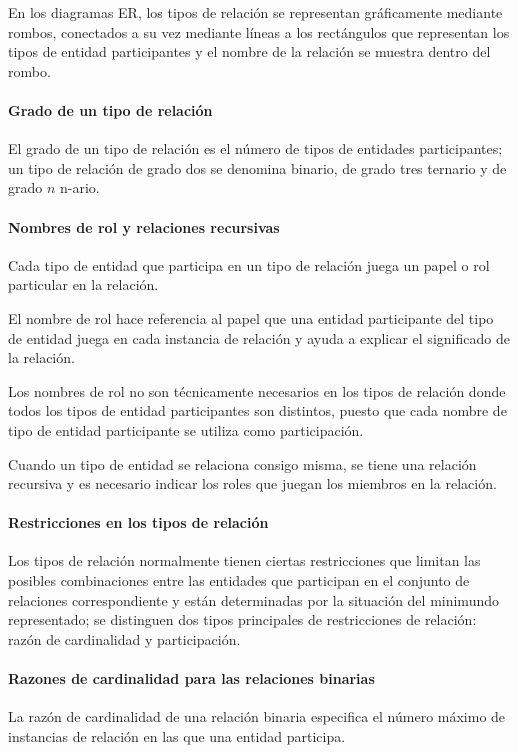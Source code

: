 En los diagramas ER, los tipos de relación se representan gráficamente mediante rombos, conectados a su vez mediante líneas a los rectángulos que representan los tipos de entidad participantes y el nombre de la relación se muestra dentro del rombo.


\paragraph*{Grado de un tipo de relación}
El grado de un tipo de relación es el número de tipos de entidades participantes; un tipo de relación de grado dos se denomina binario, de grado tres ternario y de grado $n$ n-ario. 

\paragraph*{Nombres de rol y relaciones recursivas}
Cada tipo de entidad que participa en un tipo de relación juega un papel o rol particular en la relación.


El nombre de rol hace referencia al papel que una entidad participante del tipo de entidad juega en cada instancia de relación y ayuda a explicar el significado de la relación.


Los nombres de rol no son técnicamente necesarios en los tipos de relación donde todos los tipos de entidad participantes son distintos, puesto que cada nombre de tipo de entidad participante se utiliza como participación.

Cuando un tipo de entidad se relaciona consigo misma, se tiene una relación recursiva y es necesario indicar los roles que juegan los miembros en la relación.


\paragraph*{Restricciones en los tipos de relación}


Los tipos de relación normalmente tienen ciertas restricciones que limitan las posibles combinaciones entre las entidades que participan en el conjunto de relaciones correspondiente y están determinadas por la situación del minimundo representado; se distinguen dos tipos principales de restricciones de relación: razón de cardinalidad y participación.


\paragraph*{Razones de cardinalidad para las relaciones binarias}
La razón de cardinalidad de una relación binaria especifica el número máximo de instancias de relación en las que una entidad participa.


